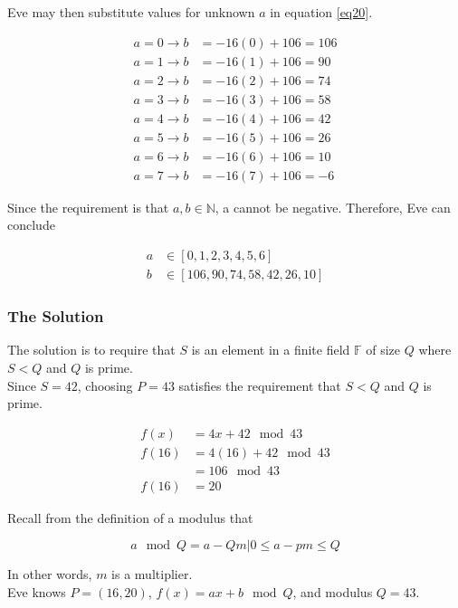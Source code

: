 \documentclass[preview,border=3mm]{article}
\begin{document}
\noindent
Eve may then substitute values for unknown $a$ in equation \ref{eq20}.

\begin{align*}
    a = 0 \rightarrow b &= -16(0) + 106 = 106 \\
    a = 1 \rightarrow b &= -16(1) + 106 = 90 \\
    a = 2 \rightarrow b &= -16(2) + 106 = 74 \\
    a = 3 \rightarrow b &= -16(3) + 106 = 58 \\
    a = 4 \rightarrow b &= -16(4) + 106 = 42 \\
    a = 5 \rightarrow b &= -16(5) + 106 = 26 \\
    a = 6 \rightarrow b &= -16(6) + 106 = 10 \\
    a = 7 \rightarrow b &= -16(7) + 106 = -6
\end{align*}

\noindent
Since the requirement is that $a,b \in \mathbb{N}$, a cannot be negative.
Therefore, Eve can conclude

\begin{align*}
    a &\in [0, 1, 2, 3, 4, 5, 6] \\
    b &\in [106, 90, 74, 58, 42, 26, 10]
\end{align*}


\subsubsection{The Solution}
The solution is to require that $S$ is an element in a finite field $\mathbb{F}$
of size $Q$ where $S < Q$ and $Q$ is prime.\\

\noindent
Since $S = 42$, choosing $P = 43$ satisfies the requirement that $S < Q$ and
$Q$ is prime.

\begin{align*}
    f(x)  &= 4x + 42 \mod 43 \\
    f(16) &= 4(16) + 42 \mod 43 \\
          &= 106 \mod 43 \\
    f(16) &= 20
\end{align*}

\noindent
Recall from the definition of a modulus that

$$a \mod Q = a - Qm | 0 \leq a - pm \leq Q$$

\noindent
In other words, $m$ is a multiplier. \\

\noindent
Eve knows $P = (16, 20)$, $f(x) = ax + b \mod Q$, and modulus $Q = 43$. \\
\end{document}

